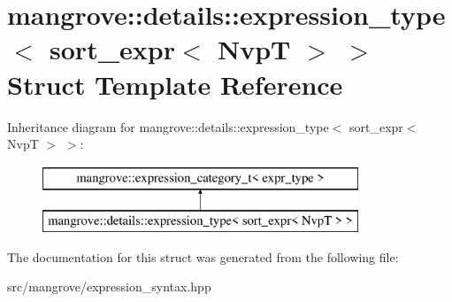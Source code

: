 \hypertarget{structmangrove_1_1details_1_1expression__type_3_01sort__expr_3_01NvpT_01_4_01_4}{}\section{mangrove\+:\+:details\+:\+:expression\+\_\+type$<$ sort\+\_\+expr$<$ NvpT $>$ $>$ Struct Template Reference}
\label{structmangrove_1_1details_1_1expression__type_3_01sort__expr_3_01NvpT_01_4_01_4}
Inheritance diagram for mangrove\+:\+:details\+:\+:expression\+\_\+type$<$ sort\+\_\+expr$<$ NvpT $>$ $>$\+:\begin{figure}[H]
\begin{center}
\leavevmode
\includegraphics[height=2.000000cm]{structmangrove_1_1details_1_1expression__type_3_01sort__expr_3_01NvpT_01_4_01_4}
\end{center}
\end{figure}


The documentation for this struct was generated from the following file\+:\begin{DoxyCompactItemize}
\item 
src/mangrove/expression\+\_\+syntax.\+hpp\end{DoxyCompactItemize}
